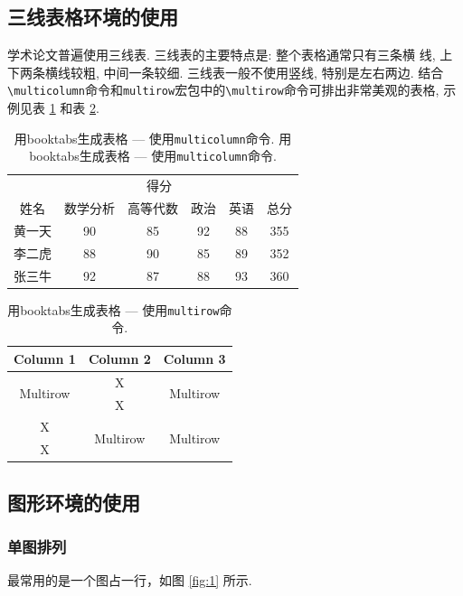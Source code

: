 \documentclass[Chinese]{APSart}
\begin{document}
\subsection{三线表格环境的使用}
学术论文普遍使用三线表. 三线表的主要特点是: 整个表格通常只有三条横
线, 上下两条横线较粗, 中间一条较细. 三线表一般不使用竖线, 特别是左右两边. 结合\verb/\multicolumn/命令和\texttt{multirow}宏包中的\verb/\multirow/命令可排出非常美观的表格, 示例见表 \ref{table:1} 和表 \ref{table:2}.


\begin{table}[htbp]
\centering{}
\caption{用booktabs生成表格 --- 使用\texttt{multicolumn}命令. 用booktabs生成表格 --- 使用\texttt{multicolumn}命令. }\label{table:1}
\vskip -5pt
	\begin{tabular}{cccccc}
		\toprule
		& \multicolumn{4}{c}{得分} & \\
		\cmidrule(lr){2-5}
		姓名 & 数学分析 & 高等代数 & 政治 & 英语 & 总分 \\
		\midrule
		黄一天 & 90 & 85 & 92 & 88 & 355 \\
		李二虎 & 88 & 90 & 85 & 89 & 352 \\
		张三牛 & 92 & 87 & 88 & 93 & 360 \\
		\bottomrule
	\end{tabular}
\end{table}

\begin{table}[htbp]
\centering{}
\caption{用booktabs生成表格 --- 使用\texttt{multirow}命令.} \label{table:2}
\vskip -5pt
\begin{tabular}{ccc}
	\toprule
	Column 1 & Column 2 & Column 3\\ 
	\midrule
	\multirow{2}{*}{Multirow}&X&\multirow{2}{*}{Multirow}\\
	&X&\\
	X&\multirow{2}{*}{Multirow}&\multirow{2}{*}{Multirow}\\
	X&&\\
	\bottomrule
\end{tabular}
\end{table}
 

\subsection{图形环境的使用}
\subsubsection{单图排列}
最常用的是一个图占一行，如图 \ref{fig:1} 所示. 
\end{document}
